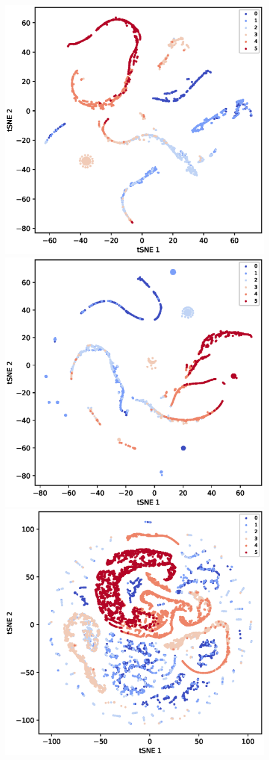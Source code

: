 \documentclass[sigconf]{acmart}
\begin{document}
\begin{figure}[htb]
\centering
\begin{center}
 \hspace*{-1in}
    \includegraphics[width=0.36\linewidth]{fig/Cora_1to3_tSNE.eps}
    \includegraphics[width=0.36\linewidth]{fig/Citeseer_1to3_tSNE.eps}
    \includegraphics[width=0.36\linewidth]{fig/PubMed_1to3_tSNE.eps}
    \hspace*{-1in}


\end{center}
\end{figure}
\end{document}
